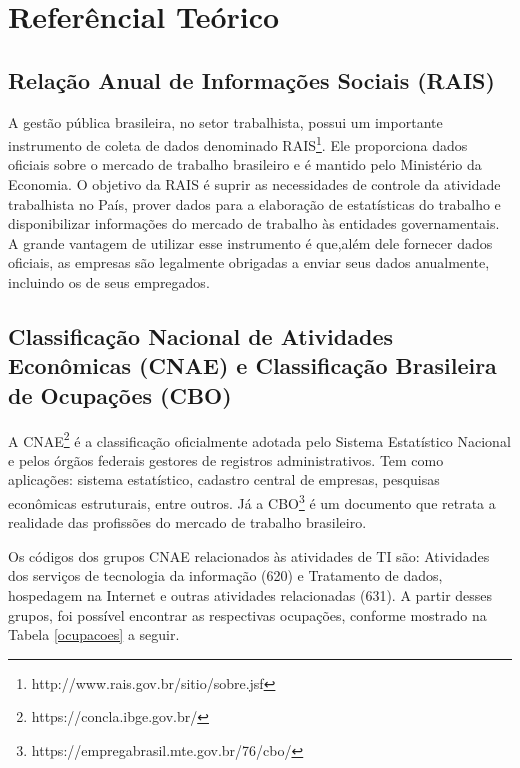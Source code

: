 \section{Referêncial Teórico}
\subsection{Relação Anual de Informações Sociais (RAIS)}

A gestão pública brasileira, no setor trabalhista, possui um importante instrumento de coleta de dados denominado RAIS\footnote{http://www.rais.gov.br/sitio/sobre.jsf}. Ele proporciona dados oficiais sobre o mercado de trabalho brasileiro e é mantido pelo Ministério da Economia. O objetivo da RAIS é suprir as necessidades de controle da atividade trabalhista no País, prover dados para a elaboração de estatísticas do trabalho e disponibilizar informações do mercado de trabalho às entidades governamentais. A grande vantagem de utilizar esse instrumento é que,além dele fornecer dados oficiais, as empresas são legalmente obrigadas a enviar seus dados anualmente, incluindo os de seus empregados.

\subsection{Classificação Nacional de Atividades Econômicas (CNAE) e Classificação Brasileira de Ocupações (CBO)}

A CNAE\footnote{https://concla.ibge.gov.br/} é a classificação oficialmente adotada pelo Sistema Estatístico Nacional e pelos órgãos federais gestores de registros administrativos. Tem como aplicações: sistema estatístico, cadastro central de empresas, pesquisas econômicas estruturais, entre outros. Já a CBO\footnote{https://empregabrasil.mte.gov.br/76/cbo/} é um documento que retrata a realidade das profissões do mercado de trabalho brasileiro. 

Os códigos dos grupos CNAE relacionados às atividades de TI são: Atividades dos serviços de tecnologia da informação (620) e Tratamento de dados, hospedagem na Internet e outras atividades relacionadas (631). A partir desses grupos, foi possível encontrar as respectivas ocupações, conforme mostrado na Tabela \ref{ocupacoes} a seguir.

